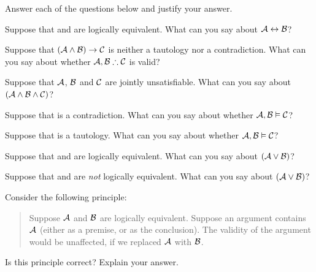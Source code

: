 \solutions
\problempart
\label{pr.TT.concepts}
Answer each of the questions below and justify your answer.
\begin{compactlist}
\item Suppose that  and  are logically equivalent. What can you say about $\mathcal{A}\leftrightarrow\mathcal{B}$?
\item Suppose that $(\mathcal{A}\wedge\mathcal{B})\rightarrow\mathcal{C}$ is neither a tautology nor a contradiction. What can you say about whether $\metav{A}, \metav{B} \therefore\metav{C}$ is valid?
\item Suppose that $\mathcal{A}$, $\mathcal{B}$ and $\mathcal{C}$  are jointly unsatisfiable. What can you say about $(\mathcal{A}\wedge\mathcal{B}\wedge\mathcal{C})$?
\item Suppose that  is a contradiction. What can you say about whether $\mathcal{A}, \mathcal{B} \vDash \mathcal{C}$?
\item Suppose that  is a tautology. What can you say about whether $\mathcal{A}, \mathcal{B}\vDash \mathcal{C}$?
\item Suppose that  and  are logically equivalent. What can you say about $(\mathcal{A}\vee\mathcal{B})$?
\item Suppose that  and  are \emph{not} logically equivalent. What can you say about $(\mathcal{A}\vee\mathcal{B})$?
\end{compactlist}
\problempart 
Consider the following principle:
	\begin{quote}
		Suppose $\mathcal{A}$ and $\mathcal{B}$ are logically equivalent. Suppose an argument contains $\mathcal{A}$ (either as a premise, or as the conclusion). The validity of the argument would be unaffected, if we replaced $\mathcal{A}$ with $\mathcal{B}$.
	\end{quote}
Is this principle correct? Explain your answer.



